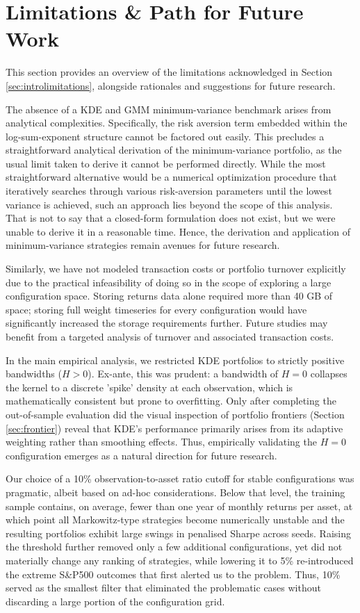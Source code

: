\newpage
\section{Limitations \& Path for Future Work}
\label{sec:limitations}
This section provides an overview of the limitations acknowledged in Section \ref{sec:introlimitations}, alongside rationales and suggestions for future research.

The absence of a KDE and GMM minimum-variance benchmark arises from analytical complexities. Specifically, the risk aversion term embedded within the log-sum-exponent structure cannot be factored out easily. This precludes a straightforward analytical derivation of the minimum-variance portfolio, as the usual limit taken to derive it cannot be performed directly. While the most straightforward alternative would be a numerical optimization procedure that iteratively searches through various risk-aversion parameters until the lowest variance is achieved, such an approach lies beyond the scope of this analysis. That is not to say that a closed-form formulation does not exist, but we were unable to derive it in a reasonable time. Hence, the derivation and application of minimum-variance strategies remain avenues for future research.

Similarly, we have not modeled transaction costs or portfolio turnover explicitly due to the practical infeasibility of doing so in the scope of exploring a large configuration space. Storing returns data alone required more than 40 GB of space; storing full weight timeseries for every configuration would have significantly increased the storage requirements further. Future studies may benefit from a targeted analysis of turnover and associated transaction costs.

In the main empirical analysis, we restricted KDE portfolios to strictly positive bandwidths ($H>0$). Ex-ante, this was prudent: a bandwidth of $H=0$ collapses the kernel to a discrete 'spike' density at each observation, which is mathematically consistent but prone to overfitting. Only after completing the out-of-sample evaluation did the visual inspection of portfolio frontiers (Section \ref{sec:frontier}) reveal that KDE's performance primarily arises from its adaptive weighting rather than smoothing effects. Thus, empirically validating the $H=0$ configuration emerges as a natural direction for future research.

Our choice of a 10\% observation-to-asset ratio cutoff for stable configurations was pragmatic, albeit based on ad-hoc considerations. Below that level, the training sample contains, on average, fewer than one year of monthly returns per asset, at which point all Markowitz-type strategies become numerically unstable and the resulting portfolios exhibit large swings in penalised Sharpe across seeds. Raising the threshold further removed only a few additional configurations, yet did not materially change any ranking of strategies, while lowering it to 5\% re-introduced the extreme S\&P500 outcomes that first alerted us to the problem. Thus, 10\% served as the smallest filter that eliminated the problematic cases without discarding a large portion of the configuration grid.

